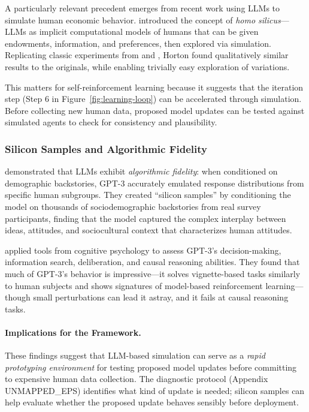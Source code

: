 A particularly relevant precedent emerges from recent work using LLMs to 
simulate human economic behavior. \citet{horton2023} introduced the concept 
of \emph{homo silicus}---LLMs as implicit computational models of humans that 
can be given endowments, information, and preferences, then explored via 
simulation. Replicating classic experiments from \citet{charness2002} and 
\citet{kahneman1986}, Horton found qualitatively similar results to the 
originals, while enabling trivially easy exploration of variations.

This matters for self-reinforcement learning because it suggests that the 
iteration step (Step 6 in Figure~\ref{fig:learning-loop}) can be accelerated 
through simulation. Before collecting new human data, proposed model updates 
can be tested against simulated agents to check for consistency and 
plausibility.

\subsubsection{Silicon Samples and Algorithmic Fidelity}

\citet{argyle2023} demonstrated that LLMs exhibit \emph{algorithmic fidelity}: 
when conditioned on demographic backstories, GPT-3 accurately emulated response 
distributions from specific human subgroups. They created ``silicon samples'' 
by conditioning the model on thousands of sociodemographic backstories from 
real survey participants, finding that the model captured the complex interplay 
between ideas, attitudes, and sociocultural context that characterizes human 
attitudes.

\citet{binz2023} applied tools from cognitive psychology to assess GPT-3's 
decision-making, information search, deliberation, and causal reasoning 
abilities. They found that much of GPT-3's behavior is impressive---it solves 
vignette-based tasks similarly to human subjects and shows signatures of 
model-based reinforcement learning---though small perturbations can lead it 
astray, and it fails at causal reasoning tasks.

\paragraph{Implications for the Framework.}
These findings suggest that LLM-based simulation can serve as a \emph{rapid 
prototyping environment} for testing proposed model updates before committing 
to expensive human data collection. The diagnostic protocol (Appendix UNMAPPED_EPS) 
identifies what kind of update is needed; silicon samples can help evaluate 
whether the proposed update behaves sensibly before deployment.

